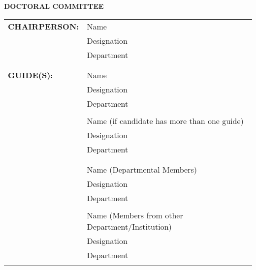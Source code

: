 
\begin{center}
{\bf  DOCTORAL COMMITTEE }
\end{center}
\begin{table}[htbp]
		\begin{tabular}[r]{ll} 
			{\bf CHAIRPERSON:\hspace{2cm}} & Name\\
			& Designation\\
			& Department\\
			&\\
			&\\
			{\bf GUIDE(S):\hspace{2cm}} & Name\\
			& Designation\\
			& Department\\
			&\\
			& Name (if candidate has more than one guide)\\
			& Designation\\
			& Department\\
			&\\
			&\\			
			& Name (Departmental Members)\\
			& Designation\\
			& Department\\
			&\\
			& Name (Members from other Department/Institution)\\
			& Designation\\
			& Department\\
			&\\
		\end{tabular}
		\label{tab:dcmember}
\end{table}
